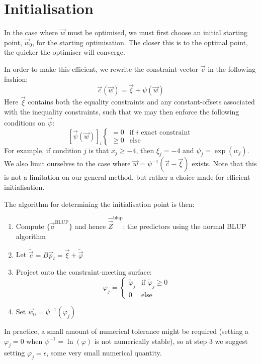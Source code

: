 	\section{Initialisation}

			In the case where $\vec{w}$ must be optimised, we must first choose an initial starting point, $\vec{w}_0$, for the starting optimisation. The closer this is to the optimal point, the quicker the optimiser will converge.

			In order to make this efficient, we rewrite the constraint vector $\vec{c}$ in the following fashion:
			\begin{equation}
				\vec{c}(\vec{w}) = \vec{\xi} + \psi(\vec{w})
			\end{equation}
			Here $\vec{\xi}$ contains both the equality constraints and any constant-offsets associated with the inequality constraints, such that we may then enforce the following conditions on $\vec{\psi}$:
			\begin{equation}
				\left[ \vec{\psi}(\vec{w}) \right]_i  \begin{cases}
						= 0 & \text{if $i$ exact constraint}
						\\
						\geq 0 & \text{else}
					\end{cases}
			\end{equation}
			For example, if condition $j$ is that $x_j \geq -4$, then $\xi_j = -4$ and $\psi_j = \exp(w_j)$. We also limit ourselves to the case where $\vec{w} = \psi^{-1}(\vec{c} - \vec{\xi})$ exists. Note that this is not a limitation on our general method, but rather a choice made for efficient initialisation.

			The algorithm for determining the initialisation point is then:
			\begin{enumerate}
				\item Compute $\{ \vec{a}^\text{BLUP} \}$ and hence $\hat{\vec{Z}}^\text{blup}$: the predictors using the normal BLUP algorithm
				\item Let $\tilde{\vec{c}} = B \vec{p}_t = \vec{\xi} + \tilde{\vec{\varphi}}$
				\item Project onto the constraint-meeting surface:
				$$ \varphi_j = \begin{cases} \tilde{\varphi}_j & \text{if } \tilde{\varphi}_j \geq 0
					\\
					0 & \text{else} \end{cases}$$
				\item Set $\vec{w}_0 = \psi^{-1}\left(\varphi_j\right)$
			\end{enumerate}
			In practice, a small amount of numerical tolerance might be required (setting a $\varphi_j =0$ when $\psi^{-1} = \ln(\varphi)$ is not numerically stable), so at step 3 we suggest setting $\varphi_j = \epsilon$, some very small numerical quantity.

